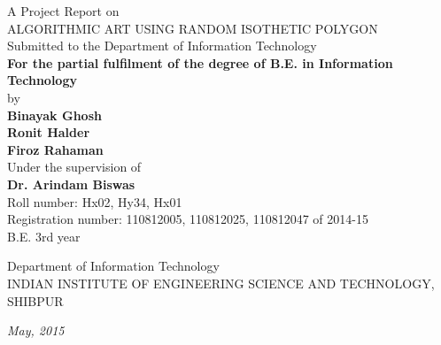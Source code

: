 \documentclass[12pt]{article}
\begin{document}
\begin{titlepage}
\thispagestyle{empty}
{\centering
{\large A Project Report on}\\
\vspace{0.5cm}
\large
{\Huge ALGORITHMIC ART USING RANDOM ISOTHETIC POLYGON}\\
\vspace{0.5cm}
Submitted to the Department of Information Technology\\
\vspace{1cm}
{\Large\bf For the partial fulfilment of the degree of B.E. in Information Technology}\\
\vspace{1cm}
by \\
\vspace{.5cm}
\hspace{.05cm} {\large \bf{Binayak Ghosh}}\\
\hspace{.05cm} {\large \bf{Ronit Halder}}\\
\hspace{.05cm} {\large \bf{Firoz Rahaman}}\\
\vspace {0.3cm}
\hspace{.05cm} Under the supervision of\\
\hspace{.05cm} {\large \bf{Dr. Arindam Biswas}}\\
\vspace {0.8cm}
Roll number: Hx02, Hy34, Hx01\\
Registration number: 110812005, 110812025, 110812047 of 2014-15\\
B.E. 3rd year\\
\vspace*{0.7cm}
\begin{figure}[h]
{\par}
\end{figure}
Department of Information Technology\\
INDIAN INSTITUTE OF ENGINEERING SCIENCE AND TECHNOLOGY, SHIBPUR\\
\begin{center}
\textit{May, 2015}
\end{center}

{\centering
\hspace{6.5cm} \date{\today}}
}
\pagebreak
\end{titlepage}
\end{document}
